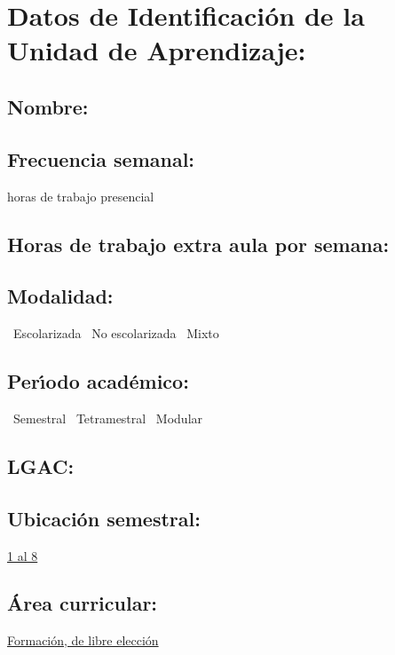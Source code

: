 \documentclass[10 pt]{article}
\begin{document}

\section{Datos de Identificaci\'{o}n de la Unidad de Aprendizaje:}
\subsection{Nombre:} 
\subsection{Frecuencia semanal:} horas de trabajo presencial
\subsection{Horas de trabajo extra aula por semana:}  %
\subsection{Modalidad:} \yes~Escolarizada \no~No escolarizada \no~Mixto
\subsection{Per\'{\i}odo acad\'{e}mico:} \yes~Semestral
\no~Tetramestral \no~Modular

%
%

\subsection{LGAC:} \underline{\seys}

\subsection{Ubicaci\'{o}n semestral:} \underline{1 al 8} %
\subsection{\'{A}rea curricular:} \underline{Formaci\'{o}n, de libre
  elecci\'{o}n} %
\end{document}
